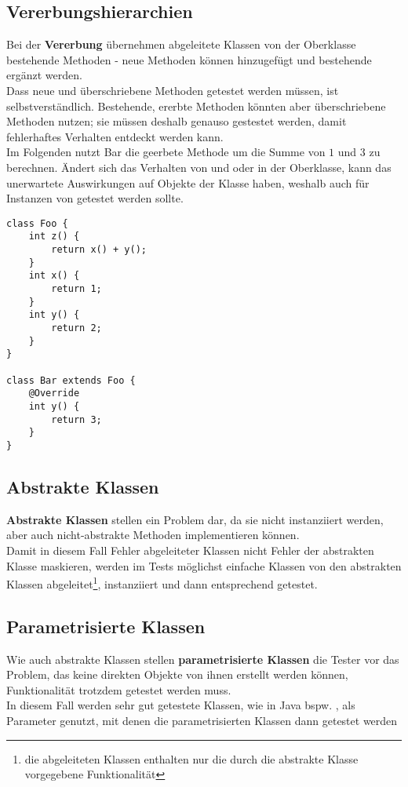 \subsection*{Vererbungshierarchien}
Bei der \textbf{Vererbung} übernehmen abgeleitete Klassen von der Oberklasse bestehende Methoden - neue Methoden können hinzugefügt und bestehende ergänzt werden.\\
Dass neue und überschriebene Methoden getestet werden müssen, ist selbstverständlich.
Bestehende, ererbte Methoden könnten aber überschriebene Methoden nutzen; sie müssen deshalb genauso gestestet werden, damit fehlerhaftes Verhalten entdeckt werden kann.\\
Im Folgenden nutzt Bar die geerbete Methode  um die Summe von $1$ und $3$ zu berechnen.
Ändert sich das Verhalten von  und oder in der Oberklasse, kann das unerwartete Auswirkungen auf Objekte der Klasse  haben, weshalb auch  für  Instanzen von  getestet werden sollte.

\begin{verbatim}
class Foo {
    int z() {
        return x() + y();
    }
    int x() {
        return 1;
    }
    int y() {
        return 2;
    }
}

class Bar extends Foo {
    @Override
    int y() {
        return 3;
    }
}
\end{verbatim}


\subsection*{Abstrakte Klassen}
\textbf{Abstrakte Klassen} stellen ein Problem dar, da sie nicht instanziiert werden, aber auch nicht-abstrakte Methoden implementieren können.\\
Damit in diesem Fall Fehler abgeleiteter Klassen nicht Fehler der abstrakten Klasse maskieren, werden im Tests möglichst einfache Klassen von den abstrakten Klassen abgeleitet\footnote{
    die abgeleiteten Klassen enthalten nur die durch die abstrakte Klasse vorgegebene Funktionalität
}, instanziiert und dann entsprechend getestet.

\subsection*{Parametrisierte Klassen}
Wie auch abstrakte Klassen stellen \textbf{parametrisierte Klassen} die Tester vor das Problem, das keine direkten Objekte von ihnen erstellt werden können, Funktionalität trotzdem getestet werden muss.\\
In diesem Fall werden sehr gut getestete Klassen, wie in Java bspw. , als Parameter genutzt, mit denen die parametrisierten Klassen dann getestet werden